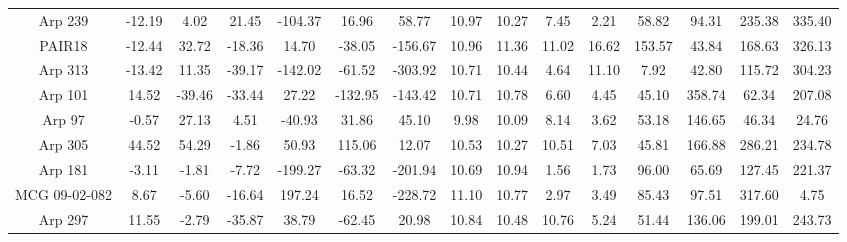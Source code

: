 \begin{table}
{\begin{tabular}{|c|c|c|c|c|c|c|c|c|c|c|c|c|c|c|}
      Arp 239 &   -12.19 &     4.02 &    21.45 &              -104.37 &                16.96 &                58.77 &                          10.97 &                          10.27 &          7.45 &          2.21 &       58.82 &       94.31 &        235.38 &        335.40 \\
      PAIR18 &   -12.44 &    32.72 &   -18.36 &                14.70 &               -38.05 &              -156.67 &                          10.96 &                          11.36 &         11.02 &         16.62 &      153.57 &       43.84 &        168.63 &        326.13 \\
      Arp 313 &   -13.42 &    11.35 &   -39.17 &              -142.02 &               -61.52 &              -303.92 &                          10.71 &                          10.44 &          4.64 &         11.10 &        7.92 &       42.80 &        115.72 &        304.23 \\
      Arp 101 &    14.52 &   -39.46 &   -33.44 &                27.22 &              -132.95 &              -143.42 &                          10.71 &                          10.78 &          6.60 &          4.45 &       45.10 &      358.74 &         62.34 &        207.08 \\
       Arp 97 &    -0.57 &    27.13 &     4.51 &               -40.93 &                31.86 &                45.10 &                           9.98 &                          10.09 &          8.14 &          3.62 &       53.18 &      146.65 &         46.34 &         24.76 \\
      Arp 305 &    44.52 &    54.29 &    -1.86 &                50.93 &               115.06 &                12.07 &                          10.53 &                          10.27 &         10.51 &          7.03 &       45.81 &      166.88 &        286.21 &        234.78 \\
      Arp 181 &    -3.11 &    -1.81 &    -7.72 &              -199.27 &               -63.32 &              -201.94 &                          10.69 &                          10.94 &          1.56 &          1.73 &       96.00 &       65.69 &        127.45 &        221.37 \\
MCG 09-02-082 &     8.67 &    -5.60 &   -16.64 &               197.24 &                16.52 &              -228.72 &                          11.10 &                          10.77 &          2.97 &          3.49 &       85.43 &       97.51 &        317.60 &          4.75 \\
      Arp 297 &    11.55 &    -2.79 &   -35.87 &                38.79 &               -62.45 &                20.98 &                          10.84 &                          10.48 &         10.76 &          5.24 &       51.44 &      136.06 &        199.01 &        243.73 \\

\end{tabular}}
\end{table}
